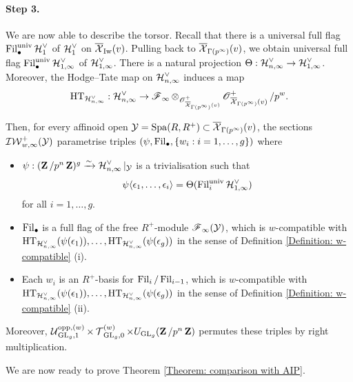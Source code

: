 \paragraph{Step 3.} We are now able to describe the torsor. Recall that there is a universal full flag $\Fil^{\univ}_{\bullet}\calH_1^{\vee}$ of $\calH_1^{\vee}$ on $\overline{\calX}_{\Iw}(v)$. Pulling back to $\overline{\calX}_{\Gamma(p^{\infty})}(v)$, we obtain universal full flag $\Fil^{\univ}_{\bullet}\calH_{1, \infty}^{\vee}$ of $\calH_{1, \infty}^{\vee}$. There is a natural projection $\Theta: \calH_{n,\infty}^{\vee}\rightarrow \calH_{1,\infty}^{\vee}$. Moreover, the Hodge--Tate map on $\calH_{n,\infty}^{\vee}$ induces a map
$$\HT_{\calH_{n,\infty}^{\vee}}: \calH_{n,\infty}^{\vee}\rightarrow \scrF_{\infty}\otimes_{\scrO^+_{\overline{\calX}_{\Gamma(p^{\infty})}(v)}}\scrO^+_{\overline{\calX}_{\Gamma(p^{\infty})}(v)}/p^w.$$

Then, for every affinoid open $\calY = \Spa(R, R^+)\subset \overline{\calX}_{\Gamma(p^{\infty})}(v)$, the sections $\adicIW_{w, \infty}^+(\calY)$ parametrise triples $(\psi, \Fil_{\bullet}, \{w_i: i=1,\ldots, g\})$ where
\begin{itemize}
\item $\psi: (\Z/p^n\Z)^g\xrightarrow{\sim} \calH_{n, \infty}^{\vee}|_{\calY}$ is a trivialisation such that
$$\psi\langle \epsilon_1, \ldots, \epsilon_i\rangle=\Theta(\Fil_i^{\univ}\calH_{1,\infty}^{\vee})$$ for all $i=1, \ldots, g$.
\item $\Fil_{\bullet}$ is a full flag of the free $R^+$-module $\scrF_{\infty}(\calY)$, which is $w$-compatible with $\HT_{\calH_{n,\infty}^{\vee}}(\psi(\epsilon_1)), \ldots, \HT_{\calH_{n,\infty}^{\vee}}(\psi(\epsilon_g))$ in the sense of Definition \ref{Definition: w-compatible} (i).
\item Each $w_i$ is an $R^+$-basis for $\Fil_i/\Fil_{i-1}$, which is $w$-compatible with $\HT_{\calH_{n,\infty}^{\vee}}(\psi(\epsilon_1)), \ldots, \HT_{\calH_{n,\infty}^{\vee}}(\psi(\epsilon_g))$ in the sense of Definition \ref{Definition: w-compatible} (ii).
\end{itemize}
Moreover, $\calU_{\GL_g, 1}^{\opp, (w)}\times \calT_{\GL_g,0}^{(w)}\times U_{\GL_g}(\Z/p^n\Z)$ permutes these triples by right multiplication.

We are now ready to prove Theorem \ref{Theorem: comparison with AIP}.

